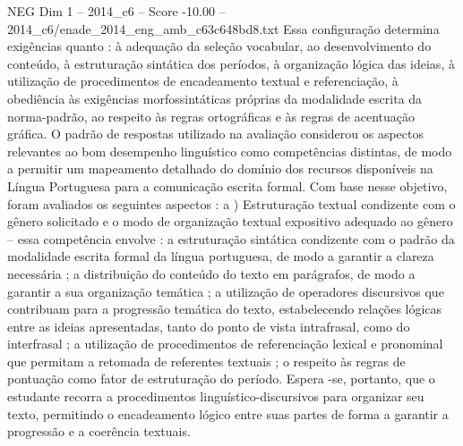 \begin{textsample}{NEG Dim 1 – 2014\_c6 – Score -10.00 – 2014\_c6/enade\_2014\_eng\_amb\_c63c648bd8.txt}
Essa configuração determina exigências quanto : à adequação da seleção vocabular, ao desenvolvimento do conteúdo, à estruturação sintática dos períodos, à organização lógica das ideias, à utilização de procedimentos de encadeamento textual e referenciação, à obediência às exigências morfossintáticas próprias da modalidade escrita da norma-padrão, ao respeito às regras ortográficas e às regras de acentuação gráfica.
O padrão de respostas utilizado na avaliação considerou os aspectos relevantes ao bom desempenho linguístico como competências distintas, de modo a permitir um mapeamento detalhado do domínio dos recursos disponíveis na Língua Portuguesa para a comunicação escrita formal.
Com base nesse objetivo, foram avaliados os seguintes aspectos : a ) Estruturação textual condizente com o gênero solicitado e o modo de organização textual expositivo adequado ao gênero – essa competência envolve : a estruturação sintática condizente com o padrão da modalidade escrita formal da língua portuguesa, de modo a garantir a clareza necessária ; a distribuição do conteúdo do texto em parágrafos, de modo a garantir a sua organização temática ; a utilização de operadores discursivos que contribuam para a progressão temática do texto, estabelecendo relações lógicas entre as ideias apresentadas, tanto do ponto de vista intrafrasal, como do interfrasal ; a utilização de procedimentos de referenciação lexical e pronominal que permitam a retomada de referentes textuais ; o respeito às regras de pontuação como fator de estruturação do período.
Espera -se, portanto, que o estudante recorra a procedimentos linguístico-discursivos para organizar seu texto, permitindo o encadeamento lógico entre suas partes de forma a garantir a progressão e a coerência textuais.

\end{textsample}
